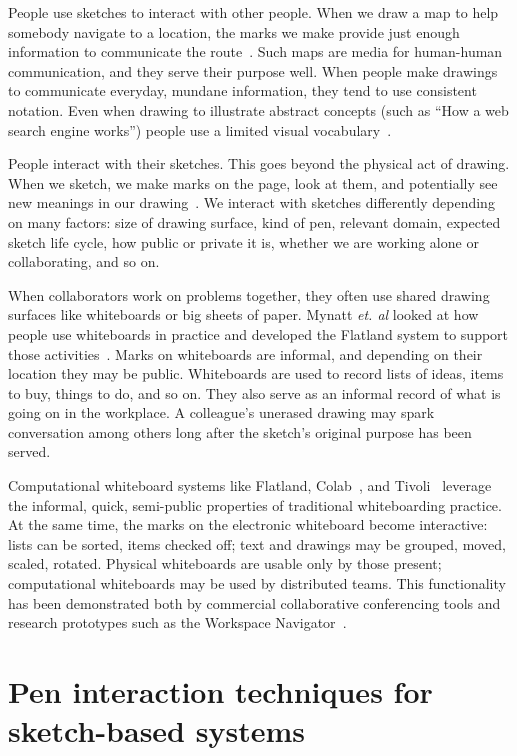 People use sketches to interact with other people. When we draw a map
to help somebody navigate to a location, the marks we make provide
just enough information to communicate the
route~\cite{tversky-routes}. Such maps are media for human-human
communication, and they serve their purpose well. When people make
drawings to communicate everyday, mundane information, they tend to
use consistent notation. Even when drawing to illustrate abstract
concepts (such as ``How a web search engine works'') people use a
limited visual vocabulary~\cite{hendry-sketching-explanations}.

People interact with their sketches. This goes beyond the physical act
of drawing. When we sketch, we make marks on the page, look at them,
and potentially see new meanings in our
drawing~\cite{goldschmidt-backtalk,schon-reflective}. We interact with
sketches differently depending on many factors: size of drawing
surface, kind of pen, relevant domain, expected sketch life cycle, how
public or private it is, whether we are working alone or
collaborating, and so on.

When collaborators work on problems together, they often use shared
drawing surfaces like whiteboards or big sheets of
paper. Mynatt \textit{et. al} looked at how people use whiteboards in
practice and developed the Flatland system to support those
activities~\cite{mynatt-flatland}. Marks on whiteboards are informal,
and depending on their location they may be public. Whiteboards are
used to record lists of ideas, items to buy, things to do, and so
on. They also serve as an informal record of what is going on in the
workplace. A colleague's unerased drawing may spark conversation among
others long after the sketch's original purpose has been served.

Computational whiteboard systems like Flatland,
Colab~\cite{stefik-colab}, and
Tivoli~\cite{pedersen-tivoli,moran-whiteboard} leverage the informal,
quick, semi-public properties of traditional whiteboarding
practice. At the same time, the marks on the electronic whiteboard
become interactive: lists can be sorted, items checked off; text and
drawings may be grouped, moved, scaled, rotated. Physical whiteboards
are usable only by those present; computational whiteboards may be
used by distributed teams. This functionality has been demonstrated
both by commercial collaborative conferencing tools and research
prototypes such as the Workspace Navigator~\cite{ju-navigator}.

\section{Pen interaction techniques for sketch-based systems}
\label{sec:interaction-techniques}

